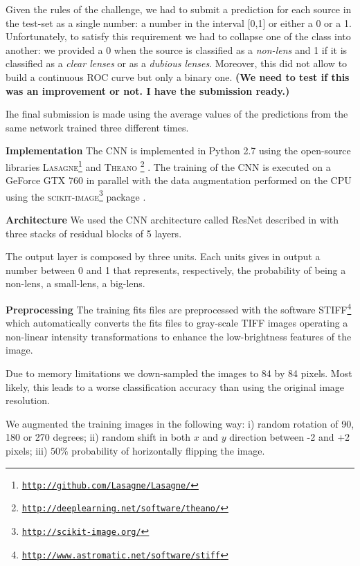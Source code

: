 \documentclass[useAMS,usenatbib]{mnras}
\begin{document}
Given the rules of the challenge, we had to submit a prediction for each source in the test-set as a single number: a number in the interval [0,1] or either a 0 or a 1. Unfortunately, to satisfy this requirement we had to collapse one of the class into another: we provided a 0 when the source is classified as a \textit{non-lens} and 1 if it is classified as a \textit{clear lenses} or as a \textit{dubious lenses}. Moreover, this did not allow to build a continuous ROC curve but only a binary one. \textbf{(We need to test if this was an improvement or not. I have the submission ready.)}

Ihe final submission is made using the average values of the predictions from the same network trained three different times.

{\bf Implementation}
The CNN is implemented in Python 2.7 using the open-source libraries \textsc{Lasagne}\footnote{\href{http://github.com/Lasagne/Lasagne/}{\tt http://github.com/Lasagne/Lasagne/}} 
and \textsc{Theano}
\footnote{\href{http://deeplearning.net/software/theano/}{\tt http://deeplearning.net/software/theano/}} \citep{theano}.  
The training of the CNN is executed on a GeForce GTX 760 in parallel with the data augmentation performed on the CPU using the \textsc{scikit-image}\footnote{\href{http://scikit-image.org/}{\tt http://scikit-image.org/}} package \citep{van2014scikit}. 

{\bf Architecture}
We used the CNN architecture called ResNet described in \citep{he2015deep} with three stacks of residual blocks of 5 layers. 

The output layer is composed by three units. Each units gives in output a number between 0 and 1 that represents, respectively, the probability of being a non-lens, a small-lens, a big-lens.

{\bf Preprocessing}
The training fits files are preprocessed with the software \textsc{STIFF}\footnote{\href{http://www.astromatic.net/software/stiff}{\tt http://www.astromatic.net/software/stiff}} which automatically converts the fits files to gray-scale TIFF images operating a non-linear intensity transformations to enhance the low-brightness features of the image.   

Due to memory limitations we down-sampled the images to 84 by 84 pixels. Most likely, this leads to a worse classification accuracy than using the original image resolution.

We augmented the training images in the following way: i) random rotation of 90, 180 or 270 degrees; ii) random shift in both $x$ and $y$ direction between -2 and +2 pixels; iii) $50\%$ probability of horizontally flipping the image. 
\end{document}
